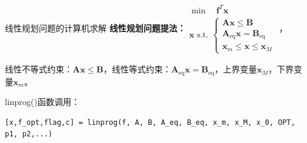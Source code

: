 \documentclass[10pt]{beamer}
\begin{document}
\begin{frame}[fragile]{线性规划问题的计算机求解}
	\textbf{线性规划问题提法：}$
	\begin{array}{l}
	\min \quad \mathbf{f}^T \mathbf{x}\\
	\mathbf{x} \text { s.t. }\left\{\begin{array}{l}
	\mathbf{A} \mathbf{x} \leqslant \mathbf{B} \\
	\mathbf{A}_{\mathrm{eq}} \mathbf{x}=\mathbf{B}_{\mathrm{eq}} \\
	\mathbf{x}_{m} \leqslant \mathbf{x} \leqslant \mathbf{x}_{M}
	\end{array}\right.
	\end{array}$，
	
	线性不等式约束：$\mathbf{A} \mathbf{x} \leqslant \mathbf{B}$，线性等式约束：$\mathbf{A}_{\mathrm{eq}} \mathbf{x}=\mathbf{B}_{\mathrm{eq}}$，上界变量$\mathbf{x}_{M}$，下界变量$\mathbf{x}_{m}$。
	
	\begin{block}{linprog()函数调用：}
\begin{lstlisting}
[x,f_opt,flag,c] = linprog(f, A, B, A_eq, B_eq, x_m, x_M, x_0, OPT, p1, p2,...)
\end{lstlisting}
	\end{block}	
	
\end{frame}
\end{document}
